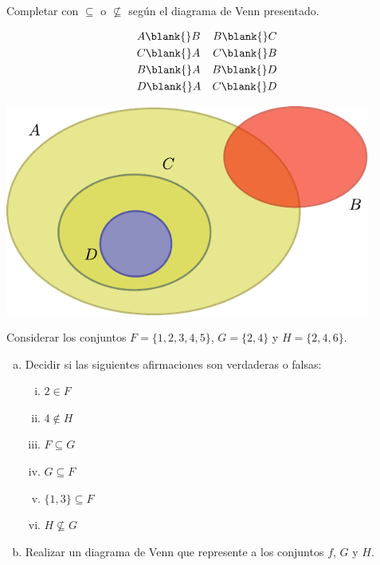 \documentclass[11pt]{article}
\begin{document}
\begin{exercise}
Completar con $\subseteq$ o $\nsubseteq$ según el diagrama de Venn presentado.

\begin{minipage}{0.4\textwidth}
\begin{align*}
    &A \blank{} B &B \blank{} C\\
    &C \blank{} A &C \blank{} B\\
    &B \blank{} A &B \blank{} D\\
    &D \blank{} A &C \blank{} D
\end{align*}
\end{minipage}
\hfill
\begin{minipage}{0.5\textwidth}
    \begin{center}
        \includegraphics[width=0.9\textwidth]{figs/ej-02.pdf}
    \end{center}
\end{minipage}
\end{exercise}

\begin{exercise}
    Considerar los conjuntos $F = \{1, 2, 3, 4, 5\}$, $G = \{2, 4\}$ y $H = \{2, 4, 6\}$.
    \begin{enumerate}[a)]
        \item Decidir si las siguientes afirmaciones son verdaderas o falsas:
            \begin{multicols}{3}
                \begin{enumerate}[i)]
                    \item $2 \in F$
                    \item $4 \notin H$
                    \item $F \subseteq G$
                    \item $G \subseteq F$
                    \item $\{1, 3\} \subseteq F$
                    \item $H \nsubseteq G$
                \end{enumerate}
            \end{multicols}
        \item Realizar un diagrama de Venn que represente a los conjuntos $f$, $G$ y $H$.
    \end{enumerate}
\end{exercise}
\end{document}

